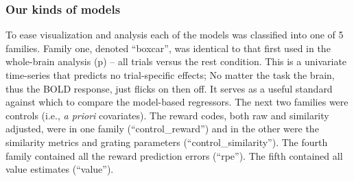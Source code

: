 \subsubsection{Our kinds of models}
\label{subsub:ourkinds}
To ease visualization and analysis each of the models was classified into one of 5 families.  Family one, denoted ``boxcar'', was identical to that first used in the whole-brain analysis (p\pageref{sub:blob}) -- all trials versus the rest condition.  This is a univariate time-series that predicts no trial-specific effects; No matter the task the brain, thus the BOLD response, just flicks on then off.  It serves as a useful standard against which to compare the model-based regressors.  The next two families were controls (i.e., \emph{a priori} covariates). The reward codes, both raw and similarity adjusted, were in one family (``control\_reward'') and in the other were the similarity metrics and grating parameters (``control\_similarity'').  The fourth family contained all the reward prediction errors (``rpe'').  The fifth contained all value estimates (``value'').

